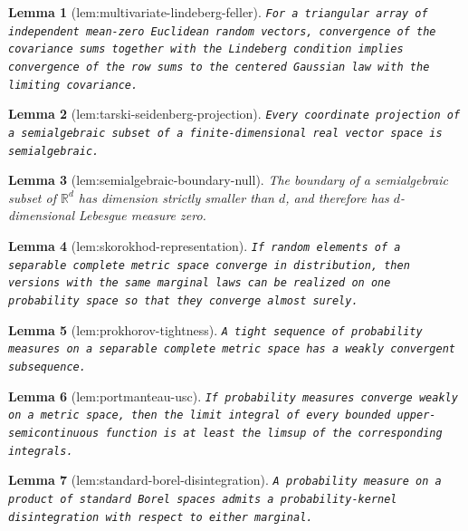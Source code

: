 \documentclass{article}
\newtheorem{lemma}{Lemma}
\begin{document}
\begin{lemma}[lem:multivariate-lindeberg-feller]\label{lem:multivariate-lindeberg-feller}
\texttt{For a triangular array of independent mean-\allowbreak{}zero Euclidean random vectors,\allowbreak{} convergence of the covariance sums together with the Lindeberg condition implies convergence of the row sums to the centered Gaussian law with the limiting covariance.}
\end{lemma}

\begin{lemma}[lem:tarski-seidenberg-projection]\label{lem:tarski-seidenberg-projection}
\texttt{Every coordinate projection of a semialgebraic subset of a finite-\allowbreak{}dimensional real vector space is semialgebraic.}
\end{lemma}

\begin{lemma}[lem:semialgebraic-boundary-null]\label{lem:semialgebraic-boundary-null}
The boundary of a semialgebraic subset of \(\mathbb R^d\) has dimension strictly smaller than \(d\), and therefore has \(d\)-dimensional Lebesgue measure zero.
\end{lemma}

\begin{lemma}[lem:skorokhod-representation]\label{lem:skorokhod-representation}
\texttt{If random elements of a separable complete metric space converge in distribution,\allowbreak{} then versions with the same marginal laws can be realized on one probability space so that they converge almost surely.}
\end{lemma}

\begin{lemma}[lem:prokhorov-tightness]\label{lem:prokhorov-tightness}
\texttt{A tight sequence of probability measures on a separable complete metric space has a weakly convergent subsequence.}
\end{lemma}

\begin{lemma}[lem:portmanteau-usc]\label{lem:portmanteau-usc}
\texttt{If probability measures converge weakly on a metric space,\allowbreak{} then the limit integral of every bounded upper-\allowbreak{}semicontinuous function is at least the limsup of the corresponding integrals.}
\end{lemma}

\begin{lemma}[lem:standard-borel-disintegration]\label{lem:standard-borel-disintegration}
\texttt{A probability measure on a product of standard Borel spaces admits a probability-\allowbreak{}kernel disintegration with respect to either marginal.}
\end{lemma}
\end{document}
